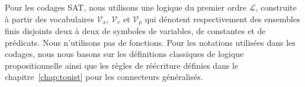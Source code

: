 
Pour les codages SAT, nous utilisons une logique du premier ordre $\mathcal{L}$, construite à partir des vocabulaires $\mathcal{V}_{x}$, $\mathcal{V}_{c}$ et $\mathcal{V}_{p}$ qui dénotent respectivement des ensembles finis disjoints deux à deux de symboles de variables, de constantes et de prédicats. Nous n'utilisons pas de fonctions. Pour les notations utilisées dans les codages, nous nous basons sur les définitions classiques de logique propositionnelle ainsi que les règles de réécriture définies dans le chapitre~\ref{chap:touist} pour les connecteurs généralisés.



